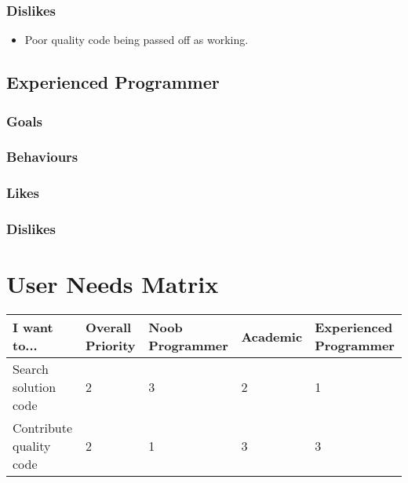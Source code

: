 \documentclass[11pt,a4paper]{article}
\begin{document}
\subsubsection{Dislikes}
\begin{itemize}
\item Poor quality code being passed off as working.
\end{itemize}

\subsection{Experienced Programmer}
\subsubsection{Goals}
\subsubsection{Behaviours}
\subsubsection{Likes}
\subsubsection{Dislikes}

\section{User Needs Matrix}

\begin{table}[h]
\begin{tabular}{*{5}{|L}|}
\hline
I want to... & Overall Priority & Noob Programmer 
& Academic & Experienced Programmer\\
\hline
Search solution code & 2 & 3 & 2 & 1 \\
\hline
Contribute quality code & 2 & 1 & 3 & 3 \\
\hline
\end{tabular}
\end{table}
\end{document}
